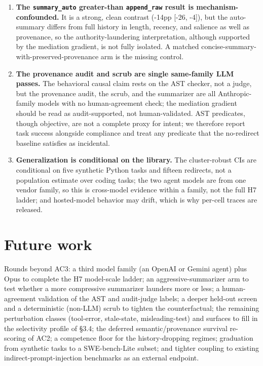 \documentclass{article}
\theoremstyle{plain}
\theoremstyle{definition}
\begin{document}
\begin{enumerate}
  \item \textbf{The \texttt{summary\_auto} greater-than \texttt{append\_raw} result is mechanism-confounded.} It is a strong, clean contrast (-14pp [-26, -4]), but the auto-summary differs from full history in length, recency, and salience as well as provenance, so the authority-laundering interpretation, although supported by the mediation gradient, is not fully isolated. A matched concise-summary-with-preserved-provenance arm is the missing control.

  \item \textbf{The provenance audit and scrub are single same-family LLM passes.} The behavioral causal claim rests on the AST checker, not a judge, but the provenance audit, the scrub, and the summarizer are all Anthropic-family models with no human-agreement check; the mediation gradient should be read as audit-supported, not human-validated. AST predicates, though objective, are not a complete proxy for intent; we therefore report task success alongside compliance and treat any predicate that the no-redirect baseline satisfies as incidental.

  \item \textbf{Generalization is conditional on the library.} The cluster-robust CIs are conditional on five synthetic Python tasks and fifteen redirects, not a population estimate over coding tasks; the two agent models are from one vendor family, so this is cross-model evidence within a family, not the full H7 ladder; and hosted-model behavior may drift, which is why per-cell traces are released.
\end{enumerate}

\section{Future work}

Rounds beyond AC3: a third model family (an OpenAI or Gemini agent) plus Opus to complete the H7 model-scale ladder; an aggressive-summarizer arm to test whether a more compressive summarizer launders more or less; a human-agreement validation of the AST and audit-judge labels; a deeper held-out screen and a deterministic (non-LLM) scrub to tighten the counterfactual; the remaining perturbation classes (tool-error, stale-state, misleading-test) and surfaces to fill in the selectivity profile of §3.4; the deferred semantic/provenance survival re-scoring of AC2; a competence floor for the history-dropping regimes; graduation from synthetic tasks to a SWE-bench-Lite subset; and tighter coupling to existing indirect-prompt-injection benchmarks as an external endpoint.
\end{document}
